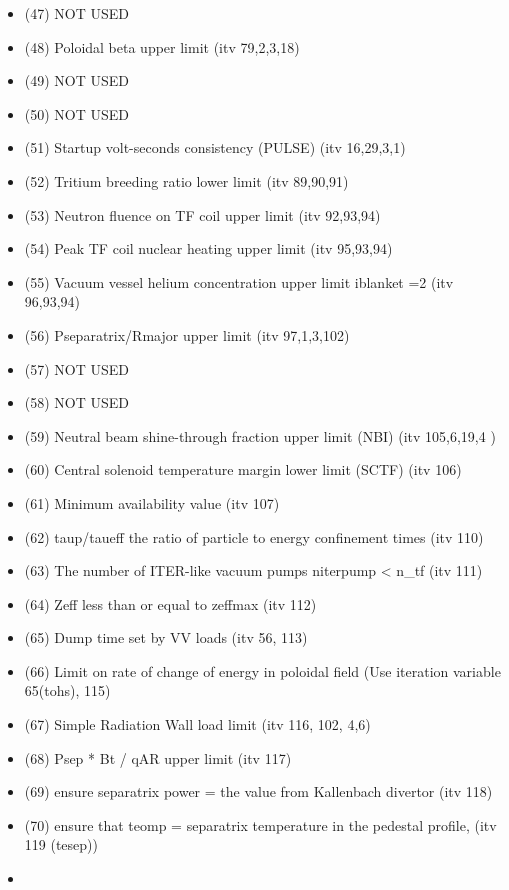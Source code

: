 \documentclass[]{article}
\begin{document}
\begin{itemize}
\begin{itemize}
  \item
    (47) NOT USED
  \item
    (48) Poloidal beta upper limit (itv 79,2,3,18)
  \item
    (49) NOT USED
  \item
    (50) NOT USED
  \item
    (51) Startup volt-seconds consistency (PULSE) (itv 16,29,3,1)
  \item
    (52) Tritium breeding ratio lower limit (itv 89,90,91)
  \item
    (53) Neutron fluence on TF coil upper limit (itv 92,93,94)
  \item
    (54) Peak TF coil nuclear heating upper limit (itv 95,93,94)
  \item
    (55) Vacuum vessel helium concentration upper limit iblanket =2 (itv
    96,93,94)
  \item
    (56) Pseparatrix/Rmajor upper limit (itv 97,1,3,102)
  \item
    (57) NOT USED
  \item
    (58) NOT USED
  \item
    (59) Neutral beam shine-through fraction upper limit (NBI) (itv
    105,6,19,4 )
  \item
    (60) Central solenoid temperature margin lower limit (SCTF) (itv
    106)
  \item
    (61) Minimum availability value (itv 107)
  \item
    (62) taup/taueff the ratio of particle to energy confinement times
    (itv 110)
  \item
    (63) The number of ITER-like vacuum pumps niterpump \textless{} n_tf
    (itv 111)
  \item
    (64) Zeff less than or equal to zeffmax (itv 112)
  \item
    (65) Dump time set by VV loads (itv 56, 113)
  \item
    (66) Limit on rate of change of energy in poloidal field (Use
    iteration variable 65(tohs), 115)
  \item
    (67) Simple Radiation Wall load limit (itv 116, 102, 4,6)
  \item
    (68) Psep * Bt / qAR upper limit (itv 117)
  \item
    (69) ensure separatrix power = the value from Kallenbach divertor
    (itv 118)
  \item
    (70) ensure that teomp = separatrix temperature in the pedestal
    profile, (itv 119 (tesep))
  \item

\end{itemize}
\end{itemize}
\end{document}
